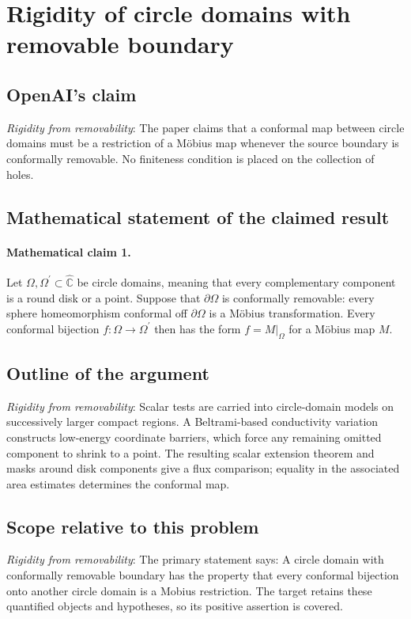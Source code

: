 \documentclass[11pt]{article}
\begin{document}
\section*{Rigidity of circle domains with removable boundary}

\subsection{OpenAI's claim}
\textit{Rigidity from removability}: The paper claims that a conformal map between circle domains must be a restriction of a Möbius map whenever the source boundary is conformally removable. No finiteness condition is placed on the collection of holes.

\subsection{Mathematical statement of the claimed result}
\paragraph{Mathematical claim 1.} Let $\Omega,\Omega^\prime\subset\widehat{\mathbb C}$ be circle domains, meaning that every complementary component is a round disk or a point. Suppose that $\partial\Omega$ is conformally removable: every sphere homeomorphism conformal off $\partial\Omega$ is a M\"obius transformation. Every conformal bijection $f:\Omega\to\Omega^\prime$ then has the form $f=M|_\Omega$ for a M\"obius map $M$.

\subsection{Outline of the argument}
\textit{Rigidity from removability}: Scalar tests are carried into circle-domain models on successively larger compact regions. A Beltrami-based conductivity variation constructs low-energy coordinate barriers, which force any remaining omitted component to shrink to a point. The resulting scalar extension theorem and masks around disk components give a flux comparison; equality in the associated area estimates determines the conformal map.

\subsection{Scope relative to this problem}
\textit{Rigidity from removability}: The primary statement says: A circle domain with conformally removable boundary has the property that every conformal bijection onto another circle domain is a Mobius restriction. The target retains these quantified objects and hypotheses, so its positive assertion is covered.
\end{document}
